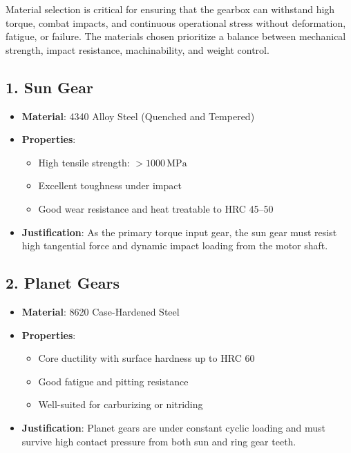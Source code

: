 \documentclass[a4paper,12pt]{article}
\begin{document}
Material selection is critical for ensuring that the gearbox can withstand high torque, combat impacts, and continuous operational stress without deformation, fatigue, or failure. The materials chosen prioritize a balance between mechanical strength, impact resistance, machinability, and weight control.

\subsection*{1. Sun Gear}
\begin{itemize}
    \item \textbf{Material}: 4340 Alloy Steel (Quenched and Tempered)
    \item \textbf{Properties}:
        \begin{itemize}
            \item High tensile strength: \( > 1000 \, \text{MPa} \)
            \item Excellent toughness under impact
            \item Good wear resistance and heat treatable to HRC 45--50
        \end{itemize}
    \item \textbf{Justification}: As the primary torque input gear, the sun gear must resist high tangential force and dynamic impact loading from the motor shaft.
\end{itemize}

\subsection*{2. Planet Gears}
\begin{itemize}
    \item \textbf{Material}: 8620 Case-Hardened Steel
    \item \textbf{Properties}:
        \begin{itemize}
            \item Core ductility with surface hardness up to HRC 60
            \item Good fatigue and pitting resistance
            \item Well-suited for carburizing or nitriding
        \end{itemize}
    \item \textbf{Justification}: Planet gears are under constant cyclic loading and must survive high contact pressure from both sun and ring gear teeth.
\end{itemize}
\end{document}
